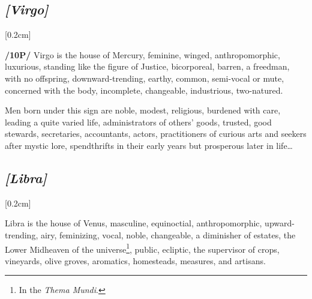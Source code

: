 \secbr
\subsection{\textit{[Virgo]}}
[0.2cm]

\textbf{/10P/}  Virgo is the house of Mercury,  feminine, winged, anthropomorphic, luxurious, standing like the figure of Justice,  bicorporeal, barren, a freedman, with no offspring, downward-trending,  earthy,  common,  semi-vocal or  mute, concerned with the body, incomplete, changeable, industrious,  two-natured. 

Men born under this sign are noble, modest, religious, burdened with care, leading a quite varied life, administrators of others’ goods, trusted, good stewards, secretaries, accountants, actors, practitioners of curious arts and seekers after mystic lore, spendthrifts in their early years but prosperous later in life\ldots 

\secbr
\subsection{\textit{[Libra]}}
[0.2cm]

 Libra is the house of Venus,  masculine,  equinoctial,  anthropomorphic, upward-trending,  airy, feminizing,  vocal, noble, changeable, a diminisher of estates, the Lower Midheaven of the universe\footnote{In the \textit{Thema Mundi}.}, public, ecliptic, the supervisor of crops, vineyards, olive groves, aromatics, homesteads, measures, and artisans.

